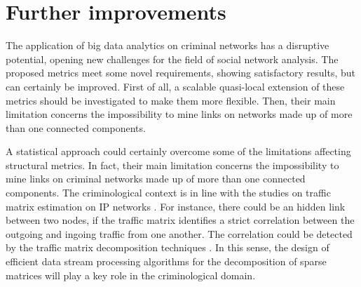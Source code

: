 \section{Further improvements}
\label{sec:further-improvements}

The application of big data analytics on criminal networks has a disruptive potential, opening new challenges for the field of social network analysis.
The proposed metrics meet some novel requirements, showing satisfactory results, but can certainly be improved. 
First of all, a scalable quasi-local extension of these metrics should be investigated to make them more flexible.
Then, their main limitation concerns the impossibility to mine links on networks made up of more than one connected components. 

A statistical approach could certainly overcome some of the limitations affecting structural metrics. In fact, their main limitation concerns the impossibility to mine links on criminal networks made up of more than one connected components.  
The criminological context is in line with the studies on traffic matrix estimation on IP networks  \cite{medina2002traffic,benameur2004traffic,papagiannaki2004distributed}. 
For instance, there could be an hidden link between two nodes, if the traffic matrix identifies a strict correlation between the outgoing and ingoing traffic from one another. 
The correlation could be detected by the traffic matrix decomposition techniques \cite{elgamal2015analysis,jiang2015covariance}. 
In this sense, the design of efficient data stream processing algorithms for the decomposition of sparse matrices will play a key role in the criminological domain.